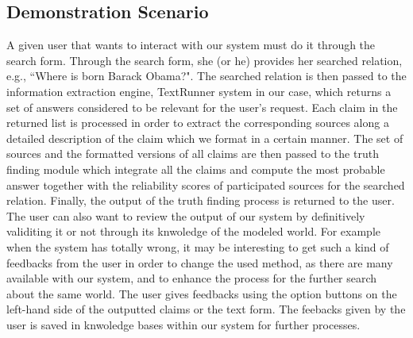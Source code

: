 \subsection{Demonstration Scenario}
A given user that wants to interact with our system
must do it through the search form. Through the search
form, she (or he) provides her searched relation, e.g.,
``Where is born Barack Obama?".
The searched relation is then 
passed to the information extraction engine,  TextRunner system
in our case, which returns a set of answers considered to be 
relevant for the user's request. Each claim in the returned list is
processed in order to extract the corresponding sources along a detailed
description of the claim which we format in a certain manner. The 
set of sources and the formatted versions of all claims are then passed
to the truth finding module which integrate all the claims and compute the
most probable answer together with the reliability scores of participated 
sources for the searched relation. Finally, the output of the truth finding
process is returned to the user. The user can also want to review the output
of our system by definitively validiting it or not through its knwoledge of the
modeled world. For example when the system has totally wrong, it may be interesting
to get such a kind of feedbacks from the user in order to change the used method, as
there are many available with our system, and to enhance the process for the further 
search about the same world. The user gives feedbacks using the option buttons on the 
left-hand side of the outputted claims or the text form. The feebacks given by the user
is saved in knwoledge bases within our system for further processes.
